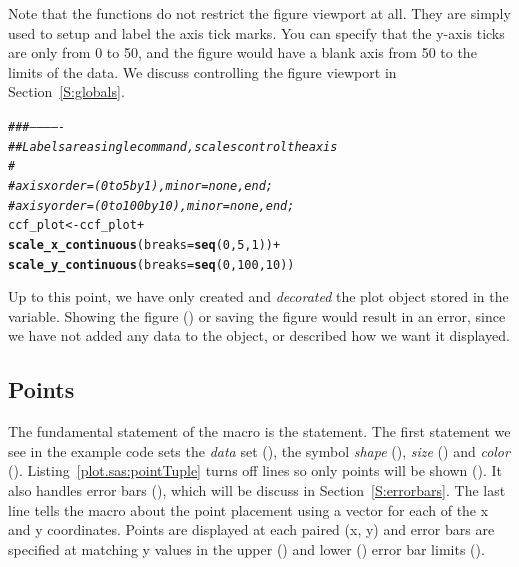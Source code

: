 \documentclass[nojss, letterpaper]{jss}\usepackage[]{graphicx}\usepackage[]{color}
\makeatletter
\newcommand{\hlnum}[1]{\textcolor[rgb]{0.686,0.059,0.569}{#1}}%
\newcommand{\hlcom}[1]{\textcolor[rgb]{0.678,0.584,0.686}{\textit{#1}}}%
\newcommand{\hlopt}[1]{\textcolor[rgb]{0,0,0}{#1}}%
\newcommand{\hlstd}[1]{\textcolor[rgb]{0.345,0.345,0.345}{#1}}%
\newcommand{\hlkwb}[1]{\textcolor[rgb]{0.69,0.353,0.396}{#1}}%
\newcommand{\hlkwc}[1]{\textcolor[rgb]{0.333,0.667,0.333}{#1}}%
\newcommand{\hlkwd}[1]{\textcolor[rgb]{0.737,0.353,0.396}{\textbf{#1}}}%
\newenvironment{kframe}{%
 \def\at@end@of@kframe{}%
 \ifinner\ifhmode%
  \def\at@end@of@kframe{\end{minipage}}%
  \begin{minipage}{\columnwidth}%
 \fi\fi%
 \def\FrameCommand##1{\hskip\@totalleftmargin \hskip-\fboxsep
 \colorbox{shadecolor}{##1}\hskip-\fboxsep
     \hskip-\linewidth \hskip-\@totalleftmargin \hskip\columnwidth}%
 \MakeFramed {\advance\hsize-\width
   \@totalleftmargin\z@ \linewidth\hsize
   \@setminipage}}%
 {\par\unskip\endMakeFramed%
 \at@end@of@kframe}
\newenvironment{knitrout}{}{} %
\makeatother
\begin{document}
Note that the  functions do not restrict the figure viewport at all. They are simply used to setup and label the axis tick marks. You can specify that the y-axis ticks are only from 0 to 50, and the figure would have a blank axis from 50 to the limits of the data. We discuss controlling the figure viewport in Section~\ref{S:globals}.

\begin{knitrout}\footnotesize
{}\color{fgcolor}\begin{kframe}
\begin{alltt}
\hlcom{###-------------}
\hlcom{## Labels are a single command, scales control the axis}
\hlcom{#}
\hlcom{#      axisx order=(0 to 5 by 1), minor=none, end;}
\hlcom{#      axisy order=(0 to 100 by 10), minor=none, end;}
\hlstd{ccf_plot} \hlkwb{<-} \hlstd{ccf_plot} \hlopt{+}
  \hlkwd{scale_x_continuous}\hlstd{(}\hlkwc{breaks}\hlstd{=}\hlkwd{seq}\hlstd{(}\hlnum{0}\hlstd{,}\hlnum{5}\hlstd{,}\hlnum{1}\hlstd{))}\hlopt{+}
  \hlkwd{scale_y_continuous}\hlstd{(}\hlkwc{breaks}\hlstd{=}\hlkwd{seq}\hlstd{(}\hlnum{0}\hlstd{,}\hlnum{100}\hlstd{,}\hlnum{10}\hlstd{))}
\end{alltt}
\end{kframe}
\end{knitrout}

Up to this point, we have only created and \emph{decorated} the plot object stored in the  variable. Showing the figure () or saving the figure would result in an error, since we have not added any data to the object, or described how we want it displayed. 

\subsection{Points}\label{S:points}

The fundamental statement of the  macro is the  statement. The first  statement we see in the example code sets the \emph{data} set (), the symbol \emph{shape} (), \emph{size} () and \emph{color} (). Listing~\ref{plot.sas:pointTuple} turns off lines so only points will be shown (). It also handles error bars (), which will be discuss in Section~\ref{S:errorbars}. The last line tells the macro about the point placement using a vector for each of the x and y coordinates.  Points are displayed at each paired (x, y) and error bars are specified at matching y values in the upper () and lower () error bar limits (). 
\end{document}
